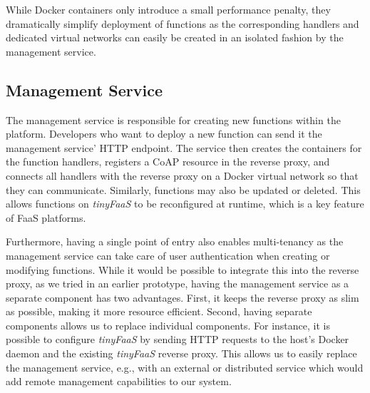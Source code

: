 While Docker containers only introduce a small performance penalty, they dramatically simplify deployment of functions as the corresponding handlers and dedicated virtual networks can easily be created in an isolated fashion by the management service.

\subsection{Management Service}
\label{sec:management}

The management service is responsible for creating new functions within the platform.
Developers who want to deploy a new function can send it the management service' HTTP endpoint.
The service then creates the containers for the function handlers, registers a CoAP resource in the reverse proxy, and connects all handlers with the reverse proxy on a Docker virtual network so that they can communicate.
Similarly, functions may also be updated or deleted.
This allows functions on \textit{tinyFaaS} to be reconfigured at runtime, which is a key feature of FaaS platforms.

Furthermore, having a single point of entry also enables multi-tenancy as the management service can take care of user authentication when creating or modifying functions.
While it would be possible to integrate this into the reverse proxy, as we tried in an earlier prototype, having the management service as a separate component has two advantages.
First, it keeps the reverse proxy as slim as possible, making it more resource efficient.
Second, having separate components allows us to replace individual components.
For instance, it is possible to configure \textit{tinyFaaS} by sending HTTP requests to the host's Docker daemon and the existing \textit{tinyFaaS} reverse proxy.
This allows us to easily replace the management service, e.g., with an external or distributed service which would add remote management capabilities to our system.
